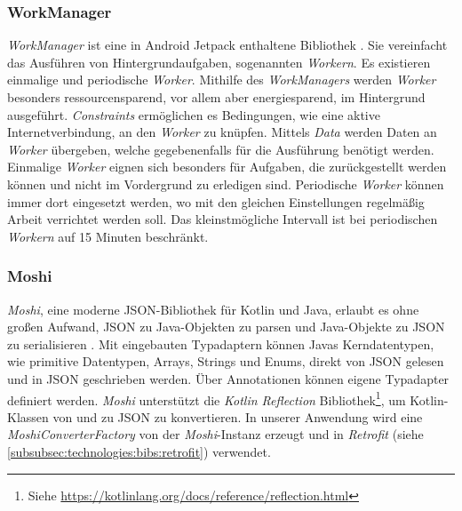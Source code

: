 \documentclass[a4paper]{article}
\begin{document}
\subsubsection{WorkManager}
\label{subsubsec:technologies:bibs:workmanager}
\textit{WorkManager} ist eine in Android Jetpack enthaltene Bibliothek \autocite{android_workmanager}.
Sie vereinfacht das Ausführen von Hintergrundaufgaben, sogenannten \textit{Workern}.
Es existieren einmalige und periodische \textit{Worker}.
Mithilfe des \textit{WorkManagers} werden \textit{Worker} besonders ressourcensparend, vor allem aber energiesparend, im Hintergrund ausgeführt.
\textit{Constraints} ermöglichen es Bedingungen, wie eine aktive Internetverbindung, an den \textit{Worker} zu knüpfen.
Mittels \textit{Data} werden Daten an \textit{Worker} übergeben, welche gegebenenfalls für die Ausführung benötigt werden.
Einmalige \textit{Worker} eignen sich besonders für Aufgaben, die zurückgestellt werden können und nicht im Vordergrund zu erledigen sind.
Periodische \textit{Worker} können immer dort eingesetzt werden, wo mit den gleichen Einstellungen regelmäßig Arbeit verrichtet werden soll.
Das kleinstmögliche Intervall ist bei periodischen \textit{Workern} auf 15 Minuten beschränkt.


\subsubsection{Moshi}
\label{subsubsec:technologies:bibs:moshi}
\textit{Moshi}, eine moderne JSON-Bibliothek für Kotlin und Java, erlaubt es ohne großen Aufwand, JSON zu Java-Objekten zu parsen und Java-Objekte zu JSON zu serialisieren \autocite{moshi}.
Mit eingebauten Typadaptern können Javas Kerndatentypen, wie primitive Datentypen, Arrays, Strings und Enums, direkt von JSON gelesen und in JSON geschrieben werden.
Über Annotationen können eigene Typadapter definiert werden.
\textit{Moshi} unterstützt die \textit{Kotlin Reflection} Bibliothek\footnote{Siehe \url{https://kotlinlang.org/docs/reference/reflection.html}}, um Kotlin-Klassen von und zu JSON zu konvertieren.
In unserer Anwendung wird eine \textit{MoshiConverterFactory} von der \textit{Moshi}-Instanz erzeugt und in \textit{Retrofit} (siehe \autoref{subsubsec:technologies:bibs:retrofit}) verwendet.
\end{document}
